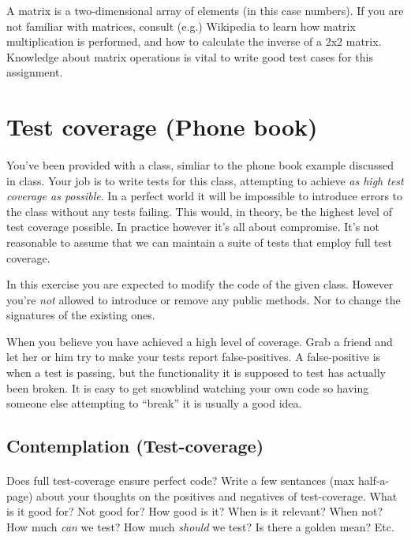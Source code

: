 \documentclass{article}
\begin{document}
      A matrix is a two-dimensional array of elements (in this case numbers). If you are not familiar with matrices, consult (e.g.) Wikipedia to learn how matrix multiplication is performed, and how to calculate the inverse of a 2x2 matrix. Knowledge about matrix operations is vital to write good test cases for this assignment.






\pagebreak
\section{ Test coverage (Phone book) }
  \paragraph{}
    You've been provided with a class, simliar to the phone book example discussed in class. Your job is to write tests for this class, attempting to achieve \emph{as high test coverage as possible}. In a perfect world it will be impossible to introduce errors to the class without any tests failing. This would, in theory, be the highest level of test coverage possible. In practice however it's all about compromise. It's not reasonable to assume that we can maintain a suite of tests that employ full test coverage.

    In this exercise you are expected to modify the code of the given class. However you're \emph{not} allowed to introduce or remove any public methods. Nor to change the signatures of the existing ones.

    When you believe you have achieved a high level of coverage. Grab a friend and let her or him try to make your tests report false-positives. A false-positive is when a test is passing, but the functionality it is supposed to test has actually been broken. It is easy to get snowblind watching your own code so having someone else attempting to ``break'' it is usually a good idea.

\subsection{ Contemplation (Test-coverage) }
  \paragraph{}
    Does full test-coverage ensure perfect code? Write a few sentances (max half-a-page) about your thoughts on the positives and negatives of test-coverage. What is it good for? Not good for? How good is it? When is it relevant? When not? How much \emph{can} we test? How much \emph{should} we test? Is there a golden mean? Etc.
\end{document}
